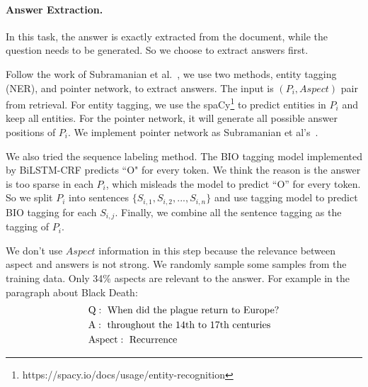 \paragraph{Answer Extraction.} In this task, the answer is exactly extracted from the document, while the question needs to be generated. So we choose to extract answers first. 

Follow the work of Subramanian et al.~, we use two methods, entity tagging (NER), and pointer network, to extract answers.
The input is $(P_i, Aspect)$ pair from retrieval. For entity tagging, we use the spaCy\footnote{https://spacy.io/docs/usage/entity-recognition} to predict entities in $P_i$ and keep all entities. For the pointer network, it will generate all possible answer positions of $P_i$. We implement pointer network as Subramanian et al's~. 

We also tried the sequence labeling method. The BIO tagging model implemented by BiLSTM-CRF predicts ``O" for every token. We think the reason is the answer is too sparse in each $P_i$, which misleads the model to predict ``O'' for every token. So we split $P_i$ into sentences $\{S_{i,1}, S_{i,2}, ..., S_{i,n}\}$ and use tagging model to predict BIO tagging for each $S_{i,j}$. Finally, we combine all the sentence tagging as the tagging of $P_i$.

We don't use $Aspect$ information in this step because the relevance between aspect and answers is not strong. We randomly sample some samples from the training data. Only 34\% aspects are relevant to the answer. For example in the paragraph about Black Death:
\begin{equation*}
\begin{aligned}
&{\rm Q:\text{\ When\ did\ the\ plague\ return\ to\ Europe?}}\\
&{\rm A:\text{\ throughout\ the\ 14th\ to\ 17th\ centuries}}\\
&{\rm Aspect:\text{\ Recurrence}}\\
\end{aligned}
\end{equation*}


